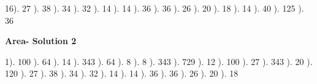 \documentclass{article}%
\begin{document}
16). 27%
). 38%
). 34%
). 32%
). 14%
). 14%
). 36%
). 36%
). 26%
). 20%
). 18%
). 14%
). 40%
). 125%
). 36%
\newline%
\newpage%
\large%
\begin{center}%
\textbf{Area- Solution 2}%
\newline%
\end{center} \normalsize%
1). 100%
). 64%
). 14%
). 343%
). 64%
). 8%
). 8%
). 343%
). 729%
). 12%
). 100%
). 27%
). 343%
). 20%
). 120%
). 27%
). 38%
). 34%
). 32%
). 14%
). 14%
). 36%
). 36%
). 26%
). 20%
). 18%
\newline%
\end{document}
